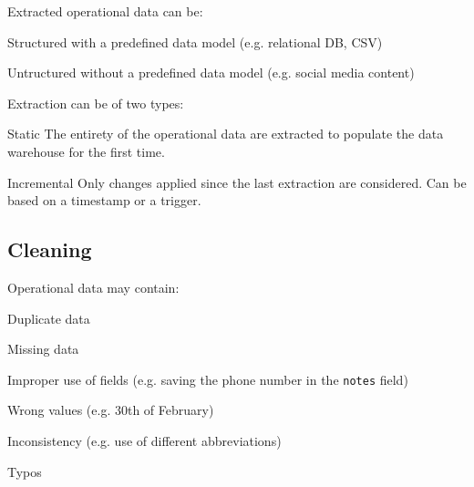 Extracted operational data can be:
\begin{descriptionlist}
    \item[Structured] 
        with a predefined data model (e.g. relational DB, CSV)

    \item[Untructured] 
        without a predefined data model (e.g. social media content)
\end{descriptionlist}

Extraction can be of two types:
\begin{descriptionlist}
    \item[Static] 
        The entirety of the operational data are extracted to populate the
        data warehouse for the first time.
    
    \item[Incremental] 
        Only changes applied since the last extraction are considered.
        Can be based on a timestamp or a trigger.
\end{descriptionlist}


\subsection{Cleaning}

Operational data may contain:
\begin{descriptionlist}
    \item[Duplicate data] 
    \item[Missing data] 
    \item[Improper use of fields] (e.g. saving the phone number in the \texttt{notes} field)
    \item[Wrong values] (e.g. 30th of February)
    \item[Inconsistency] (e.g. use of different abbreviations)
    \item[Typos]    
\end{descriptionlist}

